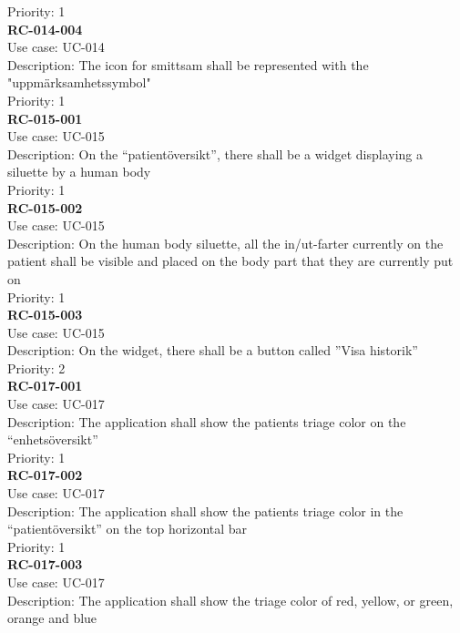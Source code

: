 Priority: 1 \\
\newline
\textbf{RC-014-004} \\
Use case: UC-014 \\
Description: The icon for smittsam shall be represented with the "uppmärksamhetssymbol" \\
Priority: 1 \\
\newline
\textbf{RC-015-001} \\
Use case: UC-015 \\
Description: On the “patientöversikt”, there shall be a widget displaying a siluette by a human body  \\
Priority: 1 \\
\newline
\textbf{RC-015-002} \\
Use case: UC-015 \\
Description: On the human body siluette, all the in/ut-farter currently on the patient shall be visible and placed on the body part that they are currently put on \\
Priority: 1 \\
\newline
\textbf{RC-015-003} \\
Use case: UC-015 \\
Description: On the widget, there shall be a button called ”Visa historik” \\
Priority: 2 \\
\newline
\textbf{RC-017-001} \\
Use case: UC-017 \\
Description: The application shall show the patients triage color on the “enhetsöversikt” \\
Priority: 1 \\
\newline
\textbf{RC-017-002} \\
Use case: UC-017 \\
Description: The application shall show the patients triage color in the “patientöversikt” on the top horizontal bar  \\
Priority: 1 \\
\newline
\textbf{RC-017-003} \\
Use case: UC-017 \\
Description: The application shall show the triage color of red, yellow, or green, orange and blue \\
